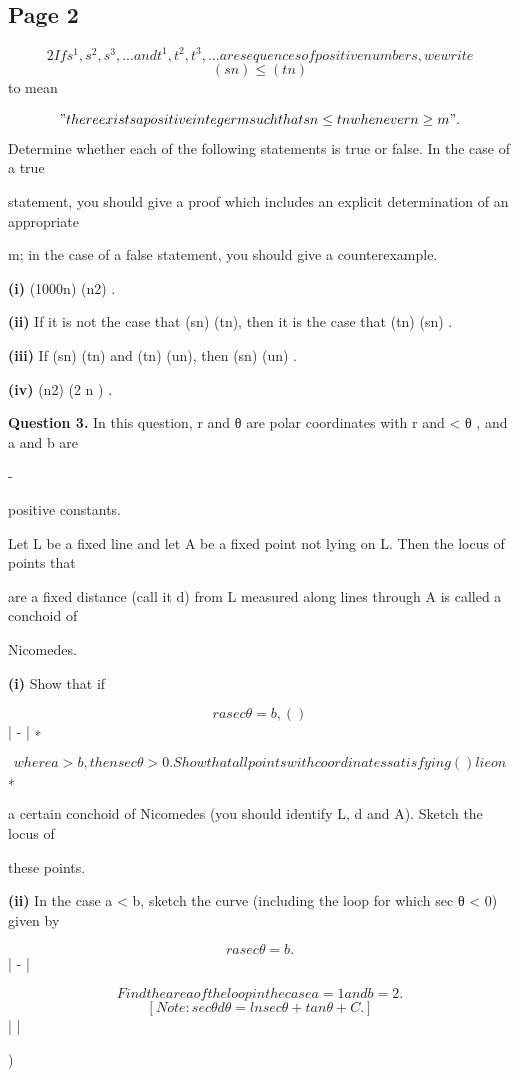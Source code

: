\documentclass[12pt]{article}
\begin{document}
\subsection*{Page 2}
\begin{flushleft}
\[2 If s^1, s^2, s^3, . . . and t^1, t^2, t^3, . . . are sequences of positive numbers, we write\]
\[(sn) \leq (tn)\]
to mean\par
\["there exists a positive integer m such that sn \leq tn whenever n \geq m".\]
Determine whether each of the following statements is true or false. In the case of a true\par
statement, you should give a proof which includes an explicit determination of an appropriate\par
m; in the case of a false statement, you should give a counterexample.\par
\textbf{(i)} (1000n) \leq (n2) .\par
\textbf{(ii)} If it is not the case that (sn) \leq (tn), then it is the case that (tn) \leq (sn) .\par
\textbf{(iii)} If (sn) \leq (tn) and (tn) \leq (un), then (sn) \leq (un) .\par
\textbf{(iv)} (n2) \leq (2 n ) .\par
\bigskip\textbf{Question 3.} In this question, r and θ are polar coordinates with r  and \pi < θ \leq \pi, and a and b are\par
-\par
positive constants.\par
Let L be a fixed line and let A be a fixed point not lying on L. Then the locus of points that\par
are a fixed distance (call it d) from L measured along lines through A is called a conchoid of\par
Nicomedes.\par
\textbf{(i)} Show that if\par
\[r a sec θ = b , ( )\]
| - | ∗\par
\[where a > b, then sec θ > 0. Show that all points with coordinates satisfying ( ) lie on\]
∗\par
a certain conchoid of Nicomedes (you should identify L, d and A). Sketch the locus of\par
these points.\par
\textbf{(ii)} In the case a < b, sketch the curve (including the loop for which sec θ < 0) given by\par
\[r a sec θ = b .\]
| - |\par
\[Find the area of the loop in the case a = 1 and b = 2.\]
\[[Note: sec θ dθ = ln sec θ + tan θ + C .]\]
| |\par
)\par
\end{flushleft}
\end{document}
